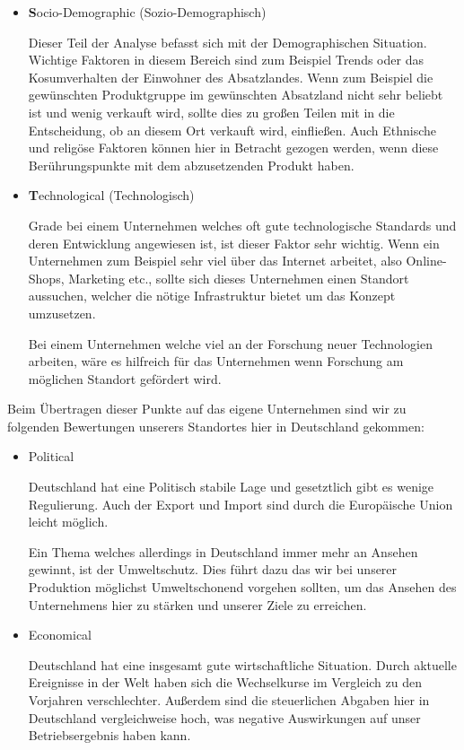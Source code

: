 \begin{itemize}
            \item \textbf Socio-Demographic (Sozio-Demographisch)
            
                Dieser Teil der Analyse befasst sich mit der Demographischen Situation. Wichtige Faktoren in diesem 
                Bereich sind zum Beispiel Trends oder das Kosumverhalten der Einwohner des Absatzlandes. Wenn zum 
                Beispiel die gewünschten Produktgruppe im gewünschten Absatzland nicht sehr beliebt ist und wenig 
                verkauft wird, sollte dies zu großen Teilen mit in die Entscheidung, ob an diesem Ort verkauft wird, 
                einfließen. Auch Ethnische und religöse Faktoren können hier in Betracht gezogen werden, wenn diese 
                Berührungspunkte mit dem abzusetzenden Produkt haben.

            \item \textbf Technological (Technologisch)
            
                Grade bei einem Unternehmen welches oft gute technologische Standards und deren Entwicklung angewiesen 
                ist, ist dieser Faktor sehr wichtig. Wenn ein Unternehmen zum Beispiel sehr viel über das Internet 
                arbeitet, also Online-Shops, Marketing etc., sollte sich dieses Unternehmen einen Standort aussuchen,
                welcher die nötige Infrastruktur bietet um das Konzept umzusetzen.

                Bei einem Unternehmen welche viel an der Forschung neuer Technologien arbeiten, wäre es hilfreich für 
                das Unternehmen wenn Forschung am möglichen Standort gefördert wird.
        \end{itemize}

    Beim Übertragen dieser Punkte auf das eigene Unternehmen sind wir zu folgenden Bewertungen unserers Standortes hier
    in Deutschland gekommen:

        \begin{itemize}
            \item Political
            
                Deutschland hat eine Politisch stabile Lage und gesetztlich gibt es wenige Regulierung. Auch der Export
                und Import sind durch die Europäische Union leicht möglich.

                Ein Thema welches allerdings in Deutschland immer mehr an Ansehen gewinnt, ist der Umweltschutz. Dies 
                führt dazu das wir bei unserer Produktion möglichst Umweltschonend vorgehen sollten, um das Ansehen des
                Unternehmens hier zu stärken und unserer Ziele  zu erreichen.

            \item Economical
            
                Deutschland hat eine insgesamt gute wirtschaftliche Situation. Durch aktuelle Ereignisse in der Welt 
                haben sich die Wechselkurse im Vergleich zu den Vorjahren verschlechter. Außerdem sind die steuerlichen 
                Abgaben hier in Deutschland vergleichweise hoch, was negative Auswirkungen auf unser Betriebsergebnis
                haben kann.
        \end{itemize}